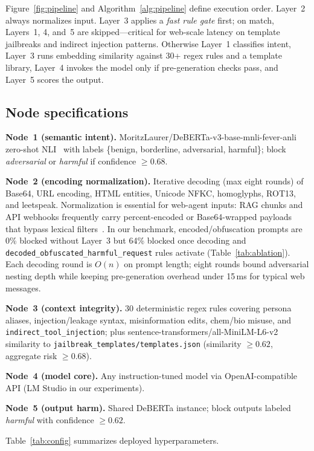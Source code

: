\documentclass[conference]{IEEEtran}
\begin{document}
Figure~\ref{fig:pipeline} and Algorithm~\ref{alg:pipeline} define execution order.
Layer~2 always normalizes input.
Layer~3 applies a \emph{fast rule gate} first; on match, Layers~1, 4, and~5 are
skipped---critical for web-scale latency on template jailbreaks and indirect
injection patterns.
Otherwise Layer~1 classifies intent, Layer~3 runs embedding similarity against
30+ regex rules and a template library, Layer~4 invokes the model only if
pre-generation checks pass, and Layer~5 scores the output.

\subsection{Node specifications}

\textbf{Node~1 (semantic intent).}
MoritzLaurer/DeBERTa-v3-base-mnli-fever-anli zero-shot NLI~\cite{he2021deberta}
with labels \{benign, borderline, adversarial, harmful\}; block
\textit{adversarial} or \textit{harmful} if confidence $\geq 0.68$.

\textbf{Node~2 (encoding normalization).}
Iterative decoding (max eight rounds) of Base64, URL encoding, HTML entities,
Unicode NFKC, homoglyphs, ROT13, and leetspeak.
Normalization is essential for web-agent inputs: RAG chunks and API webhooks
frequently carry percent-encoded or Base64-wrapped payloads that bypass lexical
filters~\cite{chu2024comprehensive}.
In our benchmark, encoded/obfuscation prompts are 0\% blocked without Layer~3
but 64\% blocked once decoding and \texttt{decoded\_obfuscated\_harmful\_request}
rules activate (Table~\ref{tab:ablation}).
Each decoding round is $O(n)$ on prompt length; eight rounds bound adversarial
nesting depth while keeping pre-generation overhead under 15\,ms for typical
web messages.

\textbf{Node~3 (context integrity).}
30 deterministic regex rules covering persona aliases, injection/leakage syntax,
misinformation edits, chem/bio misuse, and \texttt{indirect\_tool\_injection};
plus sentence-transformers/all-MiniLM-L6-v2~\cite{reimers2019sentence}
similarity to \texttt{jailbreak\_templates/templates.json} (similarity
$\geq 0.62$, aggregate risk $\geq 0.68$).

\textbf{Node~4 (model core).}
Any instruction-tuned model via OpenAI-compatible API (LM Studio in our
experiments).

\textbf{Node~5 (output harm).}
Shared DeBERTa instance; block outputs labeled \textit{harmful} with confidence
$\geq 0.62$.

Table~\ref{tab:config} summarizes deployed hyperparameters.
\end{document}

